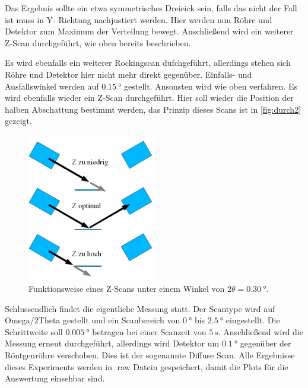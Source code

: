 Das Ergebnis sollte ein etwa symmetrisches Dreieick sein, falls das nicht der Fall ist muss in Y- Richtung nachjustiert werden.
Hier werden nun Röhre und Detektor zum Maximum der Verteilung bewegt.
Anschließend wird ein weiterer Z-Scan durchgeführt, wie oben bereits beschrieben.

Es wird ebenfalls ein weiterer Rockingscan dufchgeführt, allerdings stehen sich Röhre und Detektor hier nicht mehr direkt gegenüber. 
Einfalls- und Ausfallswinkel werden auf $\SI{0.15}{\degree}$ gestellt.
Ansonsten wird wie oben verfahren. 
Es wird ebenfalls wieder ein Z-Scan durchgeführt.
Hier soll wieder die Position der halben Abschattung bestimmt werden, das Prinzip dieses Scans ist in \autoref{fig:durch2} gezeigt.

\begin{figure}
    \centering
    \includegraphics[width=0.5\textwidth]{images/z.png}
    \caption{Funktionsweise eines Z-Scans unter einem Winkel von $2 \theta = \SI{0.30}{\degree}$. \cite{V44}}
    \label{fig:durch2}
\end{figure}

Schlussendlich findet die eigentliche Messung statt.
Der Scantype wird auf Omega/2Theta gestellt und ein Scanbereich von $\SI{0}{\degree}$ bis $\SI{2.5}{\degree}$ eingestellt.
Die Schrittweite soll $\SI{0.005}{\degree}$ betragen bei einer Scanzeit von $\SI{5}{\second}$.
Anschließend wird die Messung erneut durchgeführt, allerdings wird Detektor um $\SI{0.1}{\degree}$ gegenüber der Röntgenröhre verschoben.
Dies ist der sogenannte Diffuse Scan.
Alle Ergebnisse dieses Experiments werden in .raw Datein gespeichert, damit die Plots für die Auswertung einsehbar sind.

